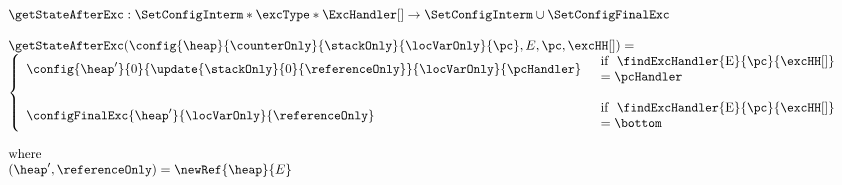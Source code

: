  
 $$\begin{array}{l}
          \getStateAfterExc : \SetConfigInterm * \excType * \ExcHandler[] \rightarrow \SetConfigInterm \cup \SetConfigFinalExc  \\
	  \\
	  \getStateAfterExc( \config{\heap}{\counterOnly}{\stackOnly}{\locVarOnly}{\pc}, E, \pc, \excHH[] ) = \\
          \left\{\begin{array}{ll}
	        \config{\heap'}{0}{\update{\stackOnly}{0}{\referenceOnly}}{\locVarOnly}{\pcHandler} & \begin{array}{l}  
                                                                                                           \mbox{\rm if \ \findExcHandler{E}{\pc}{\excHH[]}} \\
													   =\pcHandler 
												      \end{array}	   
													   \\
		& \\
		\configFinalExc{\heap'}{\locVarOnly}{\referenceOnly} & \begin{array}{l}     
		                                                             \mbox{\rm  if \ \findExcHandler{E}{\pc}{\excHH[]} } \\
		                                                             = \bottom  
		                                                        \end{array}
	  \end{array}\right.\\
	  \\
        \mbox{\rm where }\\
	(\heap', \referenceOnly )= \newRef{\heap}{E}
    \end{array}
 $$

